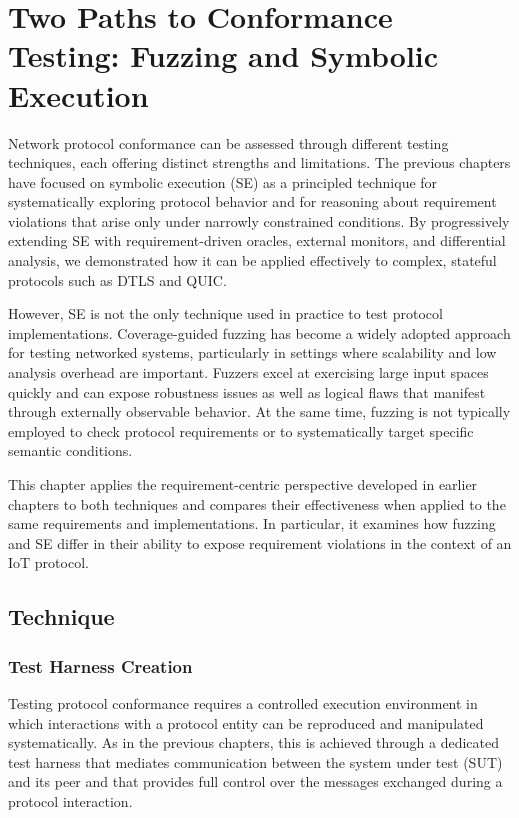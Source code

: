 \chapter{Two Paths to Conformance Testing: Fuzzing and Symbolic Execution}\label{chapter:paper4}
Network protocol conformance can be assessed through different testing techniques, each offering distinct strengths and limitations.
The previous chapters have focused on symbolic execution (SE) as a principled technique for systematically exploring protocol behavior and for reasoning about requirement violations that arise only under narrowly constrained conditions.
By progressively extending SE with requirement-driven oracles, external monitors, and differential analysis, we demonstrated how it can be applied effectively to complex, stateful protocols such as DTLS and QUIC.

However, SE is not the only technique used in practice to test protocol implementations.
Coverage-guided fuzzing has become a widely adopted approach for testing networked systems, particularly in settings where scalability and low analysis overhead are important.
Fuzzers excel at exercising large input spaces quickly and can expose robustness issues as well as logical flaws that manifest through externally observable behavior.
At the same time, fuzzing is not typically employed to check protocol requirements or to systematically target specific semantic conditions.

This chapter applies the requirement-centric perspective developed in earlier chapters to both techniques and compares their effectiveness when applied to the same requirements and implementations.
In particular, it examines how fuzzing and SE differ in their ability to expose requirement violations in the context of an IoT protocol.

\section{Technique}
\subsection{Test Harness Creation}
Testing protocol conformance requires a controlled execution environment in which interactions with a protocol entity can be reproduced and manipulated systematically.
As in the previous chapters, this is achieved through a dedicated test harness that mediates communication between the system under test (SUT) and its peer and that provides full control over the messages exchanged during a protocol interaction.


